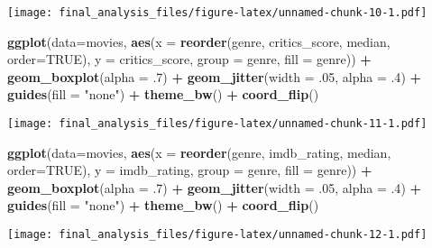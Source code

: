 \documentclass[]{article}
\newenvironment{Shaded}{\begin{snugshade}}{\end{snugshade}}
\newcommand{\DataTypeTok}[1]{\textcolor[rgb]{0.13,0.29,0.53}{#1}}
\newcommand{\FloatTok}[1]{\textcolor[rgb]{0.00,0.00,0.81}{#1}}
\newcommand{\KeywordTok}[1]{\textcolor[rgb]{0.13,0.29,0.53}{\textbf{#1}}}
\newcommand{\NormalTok}[1]{#1}
\newcommand{\OperatorTok}[1]{\textcolor[rgb]{0.81,0.36,0.00}{\textbf{#1}}}
\newcommand{\OtherTok}[1]{\textcolor[rgb]{0.56,0.35,0.01}{#1}}
\newcommand{\StringTok}[1]{\textcolor[rgb]{0.31,0.60,0.02}{#1}}
\begin{document}
\texttt{[image: final\_analysis\_files/figure-latex/unnamed-chunk-10-1.pdf]}

\begin{Shaded}
\begin{Highlighting}[]
\KeywordTok{ggplot}\NormalTok{(}\DataTypeTok{data=}\NormalTok{movies, }\KeywordTok{aes}\NormalTok{(}\DataTypeTok{x =} \KeywordTok{reorder}\NormalTok{(genre, critics_score, median, }\DataTypeTok{order=}\OtherTok{TRUE}\NormalTok{), }\DataTypeTok{y =}\NormalTok{ critics_score, }\DataTypeTok{group =}\NormalTok{ genre, }\DataTypeTok{fill =}\NormalTok{ genre)) }\OperatorTok{+}\StringTok{ }\KeywordTok{geom_boxplot}\NormalTok{(}\DataTypeTok{alpha =} \FloatTok{.7}\NormalTok{) }\OperatorTok{+}\StringTok{ }\KeywordTok{geom_jitter}\NormalTok{(}\DataTypeTok{width =} \FloatTok{.05}\NormalTok{, }\DataTypeTok{alpha =} \FloatTok{.4}\NormalTok{) }\OperatorTok{+}\StringTok{ }\KeywordTok{guides}\NormalTok{(}\DataTypeTok{fill =} \StringTok{"none"}\NormalTok{) }\OperatorTok{+}\StringTok{ }\KeywordTok{theme_bw}\NormalTok{() }\OperatorTok{+}\StringTok{ }\KeywordTok{coord_flip}\NormalTok{()}
\end{Highlighting}
\end{Shaded}

\texttt{[image: final\_analysis\_files/figure-latex/unnamed-chunk-11-1.pdf]}

\begin{Shaded}
\begin{Highlighting}[]
\KeywordTok{ggplot}\NormalTok{(}\DataTypeTok{data=}\NormalTok{movies, }\KeywordTok{aes}\NormalTok{(}\DataTypeTok{x =} \KeywordTok{reorder}\NormalTok{(genre, imdb_rating, median, }\DataTypeTok{order=}\OtherTok{TRUE}\NormalTok{), }\DataTypeTok{y =}\NormalTok{ imdb_rating, }\DataTypeTok{group =}\NormalTok{ genre, }\DataTypeTok{fill =}\NormalTok{ genre)) }\OperatorTok{+}\StringTok{ }\KeywordTok{geom_boxplot}\NormalTok{(}\DataTypeTok{alpha =} \FloatTok{.7}\NormalTok{) }\OperatorTok{+}\StringTok{ }\KeywordTok{geom_jitter}\NormalTok{(}\DataTypeTok{width =} \FloatTok{.05}\NormalTok{, }\DataTypeTok{alpha =} \FloatTok{.4}\NormalTok{) }\OperatorTok{+}\StringTok{ }\KeywordTok{guides}\NormalTok{(}\DataTypeTok{fill =} \StringTok{"none"}\NormalTok{) }\OperatorTok{+}\StringTok{ }\KeywordTok{theme_bw}\NormalTok{() }\OperatorTok{+}\StringTok{ }\KeywordTok{coord_flip}\NormalTok{()}
\end{Highlighting}
\end{Shaded}

\texttt{[image: final\_analysis\_files/figure-latex/unnamed-chunk-12-1.pdf]}
\end{document}
